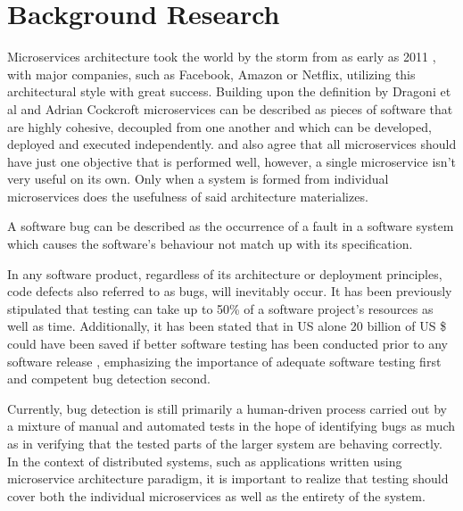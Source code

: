 \chapter{Background Research}\label{chp:background-research}
Microservices architecture took the world by the storm from as early as 2011 \cite{fowlerOnMicroservices}, with major companies, such as Facebook, Amazon or Netflix, utilizing this architectural style with great success. 
Building upon the definition by Dragoni et al \cite{dragoniOnMs} and Adrian Cockcroft \cite{understandingOfMicroservices} microservices can be described as pieces of software that are highly cohesive, decoupled from one another and which can be developed, deployed and executed independently. \cite{dragoniOnMs} and \cite{understandingOfMicroservices} also agree that all microservices should have just one objective that is performed well, however, a single microservice isn't very useful on its own. Only when a system is formed from individual microservices does the usefulness of said architecture materializes.

A software bug can be described as the occurrence of a fault in a software system which causes the software's behaviour not match up with its specification\cite{predicting-severity-of-a-bug}.
  
In any software product, regardless of its architecture or deployment principles, code defects also referred to as bugs, will inevitably occur. It has been previously stipulated that testing can take up to 50\% of a software project's resources as well as time. Additionally, it has been stated that in US alone 20 billion of US \$ could have been saved if better software testing has been conducted prior to any software release \cite{auto-bug-fixing}, emphasizing the importance of adequate software testing first and competent bug detection second.

Currently, bug detection is still primarily a human-driven process carried out by a mixture of manual and automated tests in the hope of identifying bugs as much as in verifying that the tested parts of the larger system are behaving correctly. 
In the context of distributed systems, such as applications written using microservice architecture paradigm, it is important to realize that testing should cover both the individual microservices as well as the entirety of the system.

